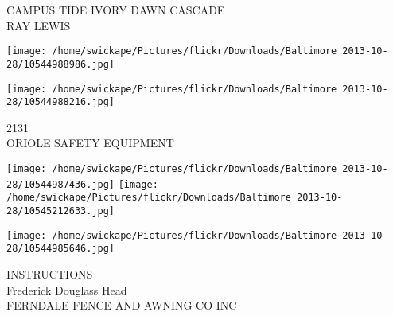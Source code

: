 \documentclass[10pt,letterpaper]{article}
\begin{document}
CAMPUS TIDE IVORY DAWN CASCADE\\
RAY LEWIS\\
\pagebreak

\texttt{[image: /home/swickape/Pictures/flickr/Downloads/Baltimore 2013-10-28/10544988986.jpg]}

\vspace{0.25in}
\texttt{[image: /home/swickape/Pictures/flickr/Downloads/Baltimore 2013-10-28/10544988216.jpg]}

2131\\
ORIOLE SAFETY EQUIPMENT\\
\pagebreak

\texttt{[image: /home/swickape/Pictures/flickr/Downloads/Baltimore 2013-10-28/10544987436.jpg]}
\texttt{[image: /home/swickape/Pictures/flickr/Downloads/Baltimore 2013-10-28/10545212633.jpg]}

\texttt{[image: /home/swickape/Pictures/flickr/Downloads/Baltimore 2013-10-28/10544985646.jpg]}

INSTRUCTIONS\\
Frederick Douglass Head\\
FERNDALE FENCE AND AWNING CO INC\\
\pagebreak
\end{document}
